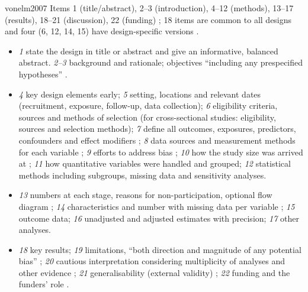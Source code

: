 \begin{papercard}{vonelm2007}
 Items 1 (title/abstract), 2--3 (introduction), 4--12 (methods), 13--17 (results), 18--21 (discussion), 22 (funding) ; 18 items are common to all designs and four (6, 12, 14, 15) have design-specific versions .
\begin{itemize}\itemsep0pt
\item \emph{1} state the design in title or abstract  and give an informative, balanced abstract. \emph{2--3} background and rationale; objectives ``including any prespecified hypotheses'' .
\item \emph{4} key design elements early; \emph{5} setting, locations and relevant dates (recruitment, exposure, follow-up, data collection); \emph{6} eligibility criteria, sources and methods of selection (for cross-sectional studies: eligibility, sources and selection methods); \emph{7} define all outcomes, exposures, predictors, confounders and effect modifiers ; \emph{8} data sources and measurement methods for each variable ; \emph{9} efforts to address bias ; \emph{10} how the study size was arrived at ; \emph{11} how quantitative variables were handled and grouped; \emph{12} statistical methods including subgroups, missing data  and sensitivity analyses.
\item \emph{13} numbers at each stage, reasons for non-participation, optional flow diagram ; \emph{14} characteristics and number with missing data per variable ; \emph{15} outcome data; \emph{16} unadjusted and adjusted estimates with precision; \emph{17} other analyses.
\item \emph{18} key results; \emph{19} limitations, ``both direction and magnitude of any potential bias'' ; \emph{20} cautious interpretation considering multiplicity of analyses and other evidence ; \emph{21} generalisability (external validity) ; \emph{22} funding and the funders' role .
\end{itemize}


\end{papercard}
